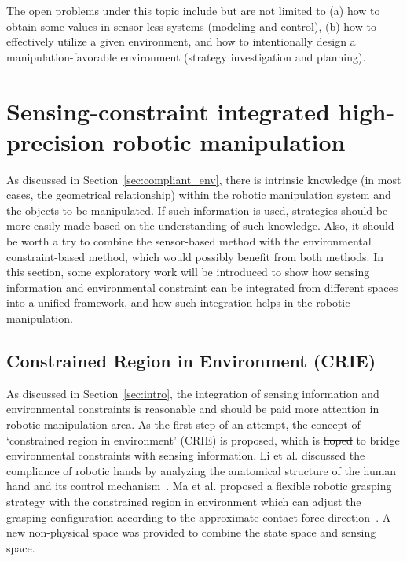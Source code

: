 \documentclass[journal,twoside,web]{ieeecolor}
\providecommand{\DIFadd}[1]{{\protect\color{blue}\uwave{#1}}} %
\providecommand{\DIFdel}[1]{{\protect\color{red}\sout{#1}}}                      %
\providecommand{\DIFaddbegin}{} %
\providecommand{\DIFaddend}{} %
\providecommand{\DIFdelbegin}{} %
\providecommand{\DIFdelend}{} %
\newcommand{\DIFscaledelfig}{0.5}
\newlength{\DIFdelgraphicswidth} %
\newlength{\DIFdelgraphicsheight} %
\newcommand{\DIFaddincludegraphics}[2][]{{\color{blue}\fbox{\DIFOincludegraphics[#1]{#2}}}} %
\newcommand{\DIFdelincludegraphics}[2][]{%
\sbox{\DIFdelgraphicsbox}{\DIFOincludegraphics[#1]{#2}}%
\settoboxwidth{\DIFdelgraphicswidth}{\DIFdelgraphicsbox} %
\settoboxtotalheight{\DIFdelgraphicsheight}{\DIFdelgraphicsbox} %
\scalebox{\DIFscaledelfig}{%
\parbox[b]{\DIFdelgraphicswidth}{\usebox{\DIFdelgraphicsbox}\\[-\baselineskip] \rule{\DIFdelgraphicswidth}{0em}}\llap{\resizebox{\DIFdelgraphicswidth}{\DIFdelgraphicsheight}{%
\setlength{\unitlength}{\DIFdelgraphicswidth}%
\begin{picture}(1,1)%
\thicklines\linethickness{2pt} %
{\color[rgb]{1,0,0}\put(0,0){\framebox(1,1){}}}%
{\color[rgb]{1,0,0}\put(0,0){\line( 1,1){1}}}%
{\color[rgb]{1,0,0}\put(0,1){\line(1,-1){1}}}%
\end{picture}%
}\hspace*{3pt}}} %
} %
\DeclareRobustCommand{\DIFaddbegin}{\DIFOaddbegin \let\includegraphics\DIFaddincludegraphics} %
\DeclareRobustCommand{\DIFaddend}{\DIFOaddend \let\includegraphics\DIFOincludegraphics} %
\DeclareRobustCommand{\DIFdelbegin}{\DIFOdelbegin \let\includegraphics\DIFdelincludegraphics} %
\DeclareRobustCommand{\DIFdelend}{\DIFOaddend \let\includegraphics\DIFOincludegraphics} %
\begin{document}
The open problems under this topic include but are not limited to (a) how to obtain some values in sensor-less systems (modeling and control), (b) how to effectively utilize a given environment, and how to intentionally design a manipulation-favorable environment (strategy investigation and planning).

\section{Sensing-constraint integrated high-precision robotic manipulation}
\label{sec:compliant_integration}

As discussed in Section~\ref{sec:compliant_env}, there is intrinsic knowledge (in most cases, the geometrical relationship) within the robotic manipulation system and the objects to be manipulated. 
If such information is used, strategies should be more easily made based on the understanding of such knowledge. 
Also, it should be worth a try to combine the sensor-based method with the environmental constraint-based method, which would possibly benefit from both methods. 
In this section, some exploratory work will be introduced to show how sensing information and environmental constraint can be integrated from different spaces into a unified framework, and how such integration helps in the robotic manipulation.


\subsection{Constrained Region in Environment (CRIE)}
\label{subsec:crie}

As discussed in Section~\ref{sec:intro}, the integration of sensing information and environmental constraints is reasonable and should be paid more attention in \DIFaddbegin \DIFadd{the }\DIFaddend robotic manipulation area. 
As the first step of an attempt, the concept of `constrained region in environment' (CRIE) is proposed, which is \DIFdelbegin \DIFdel{hoped }\DIFdelend \DIFaddbegin \DIFadd{expected }\DIFaddend to bridge environmental constraints with sensing information. 
Li et al. discussed the compliance of robotic hands by analyzing the anatomical structure of the human hand and its control mechanism~\cite{Li2015}.
Ma et al. proposed a flexible robotic grasping strategy with the constrained region in environment which can adjust the grasping configuration according to the approximate contact force direction~\cite{Ma2017}. A new non-physical space was provided to combine the state space and sensing space.
\end{document}
